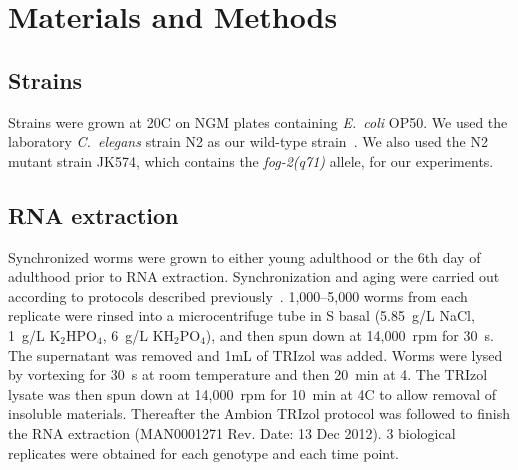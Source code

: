 \documentclass[9pt,twocolumn,twoside]{gsag3jnl}
\newcommand{\cel}{\emph{C.~elegans}}
\newcommand{\gene}[1]{\emph{\mbox{#1}}}
\newcommand{\ecol}{\emph{E.~coli}}
\begin{document}
\section{Materials and Methods}
\label{sec:materials_methods}

\subsection*{Strains}
\label{sub:Strains}
Strains were grown at 20\degree{}C on NGM plates containing \ecol{} OP50. We
used the laboratory \cel{} strain N2 as our wild-type strain~\citep{Brenner1974}.
We also used the N2 mutant strain JK574, which contains the \gene{fog-2(q71)}
allele, for our experiments.

\subsection*{RNA extraction}
\label{sb:rna_extraction}
Synchronized worms were grown to either young adulthood or the 6th day of
adulthood prior to RNA extraction. Synchronization and aging were carried out
according to protocols described previously~\citep{Leighton2014}. 1,000--5,000
worms from each replicate were rinsed into a microcentrifuge tube in S basal
(5.85~g/L NaCl, 1~g/L $\mathrm{K}_2\mathrm{HPO}_4$, 6~g/L
$\mathrm{KH}_2\mathrm{PO}_4$), and then spun down at 14,000~rpm for 30~s. The
supernatant was removed and 1mL of TRIzol was added. Worms were lysed by
vortexing for 30~s at room temperature and then 20~min at 4\degree. The TRIzol
lysate was then spun down at 14,000~rpm for 10~min at 4\degree{}C to allow
removal of insoluble materials. Thereafter the Ambion TRIzol protocol was
followed to finish the RNA extraction (MAN0001271 Rev. Date: 13 Dec 2012).
3 biological replicates were obtained for each genotype and each time point.
\end{document}
